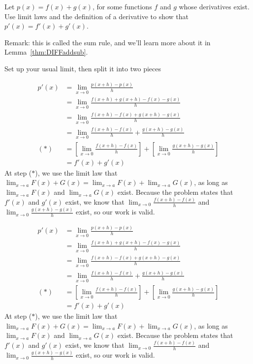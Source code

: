 \begin{question}Let $p(x)=f(x)+g(x)$, for some functions $f$ and $g$ whose derivatives exist. Use limit laws and the definition of a derivative to show that $p'(x)=f'(x)+g'(x)$.

Remark: this is called the sum rule, and we'll learn more about it in Lemma~\ref*{thm:DIFFaddsub}.
\end{question}
\begin{hint} Set up your usual limit, then split it into two pieces
\end{hint}
\begin{answer}\begin{align*}
p'(x) &= \lim_{x \rightarrow 0} \frac{p(x+h)-p(x)}{h}\\
&= \lim_{x \rightarrow 0} \frac{f(x+h)+g(x+h)-f(x)-g(x)}{h}\\
&= \lim_{x \rightarrow 0} \frac{f(x+h)-f(x)+g(x+h)-g(x)}{h}\\
&= \lim_{x \rightarrow 0} \frac{f(x+h)-f(x)}{h}+
\frac{g(x+h)-g(x)}{h}\\
(*)&= \left[\lim_{x \rightarrow 0} \frac{f(x+h)-f(x)}{h}\right]+ \left[\lim_{x \rightarrow 0}
\frac{g(x+h)-g(x)}{h}\right]\\
&= f'(x)+g'(x)
\end{align*}
At step ($*$), we use the limit law that $\displaystyle\lim_{x \rightarrow a} F(x)+G(x) = \displaystyle\lim_{x \rightarrow a} F(x)+\displaystyle\lim_{x \rightarrow a}G(x)$, as long as  $\displaystyle\lim_{x \rightarrow a} F(x)$ and $\displaystyle\lim_{x \rightarrow a}G(x)$ exist. Because the problem states that $f'(x)$ and $g'(x)$ exist, we know that $\displaystyle\lim_{x \rightarrow 0} \frac{f(x+h)-f(x)}{h}$ and $\displaystyle\lim_{x \rightarrow 0}
\frac{g(x+h)-g(x)}{h}$ exist, so our work is valid.
\end{answer}
\begin{solution}
\begin{align*}
p'(x) &= \lim_{x \rightarrow 0} \frac{p(x+h)-p(x)}{h}\\
&= \lim_{x \rightarrow 0} \frac{f(x+h)+g(x+h)-f(x)-g(x)}{h}\\
&= \lim_{x \rightarrow 0} \frac{f(x+h)-f(x)+g(x+h)-g(x)}{h}\\
&= \lim_{x \rightarrow 0} \frac{f(x+h)-f(x)}{h}+
\frac{g(x+h)-g(x)}{h}\\
(*)&= \left[\lim_{x \rightarrow 0} \frac{f(x+h)-f(x)}{h}\right]+ \left[\lim_{x \rightarrow 0}
\frac{g(x+h)-g(x)}{h}\right]\\
&= f'(x)+g'(x)
\end{align*}
At step ($*$), we use the limit law that $\displaystyle\lim_{x \rightarrow a} F(x)+G(x) = \displaystyle\lim_{x \rightarrow a} F(x)+\displaystyle\lim_{x \rightarrow a}G(x)$, as long as  $\displaystyle\lim_{x \rightarrow a} F(x)$ and $\displaystyle\lim_{x \rightarrow a}G(x)$ exist. Because the problem states that $f'(x)$ and $g'(x)$ exist, we know that $\displaystyle\lim_{x \rightarrow 0} \frac{f(x+h)-f(x)}{h}$ and $\displaystyle\lim_{x \rightarrow 0}
\frac{g(x+h)-g(x)}{h}$ exist, so our work is valid.
\end{solution}


